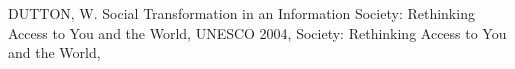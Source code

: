 \documentclass[
12pt,		%
openright,	%
twoside,  %
a4paper,			%
chapter=TITLE,		%
english,			%
french,				%
spanish,			%
brazil				%
]{USPSC-classe/USPSC}
\begin{document}
\begin{flushleft}
\begin{flushleft}
\begin{flushleft}
\begin{flushleft}
\begin{flushleft}
\begin{flushleft}
\begin{flushleft}
\begin{flushleft}
\begin{flushleft}
\begin{flushleft}
\begin{flushleft}
\begin{flushleft}
\begin{flushleft}
\begin{flushleft}
[DUTTON, 2004] DUTTON, W. Social Transformation in an Information Society: Rethinking Access to You and the World, UNESCO 2004, Society: Rethinking Access to You and the World, 
\end{flushleft}


\end{flushleft}


\end{flushleft}


\end{flushleft}


\end{flushleft}


\end{flushleft}


\end{flushleft}


\end{flushleft}


\end{flushleft}


\end{flushleft}


\end{flushleft}


\end{flushleft}


\end{flushleft}


\end{flushleft}
\end{document}
